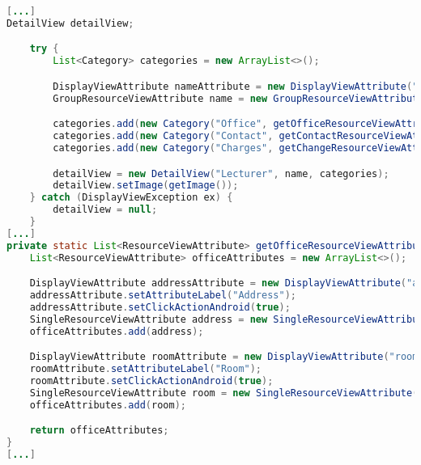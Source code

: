 \newpage

\begin{lstlisting}[label=lst:detailview_impl,
language=java,
firstnumber=1,
caption=Erstellung einer \textit{DetailView}.]				   
[...]
DetailView detailView;

	try {
		List<Category> categories = new ArrayList<>();

		DisplayViewAttribute nameAttribute = new DisplayViewAttribute("name", ViewAttribute.AttributeType.TEXT);
		GroupResourceViewAttribute name = new GroupResourceViewAttribute(nameAttribute, getViewTitleAttributes());

		categories.add(new Category("Office", getOfficeResourceViewAttributes()));
		categories.add(new Category("Contact", getContactResourceViewAttributes()));
		categories.add(new Category("Charges", getChangeResourceViewAttributes()));

		detailView = new DetailView("Lecturer", name, categories);
		detailView.setImage(getImage());
	} catch (DisplayViewException ex) {
		detailView = null;
	}
[...]
private static List<ResourceViewAttribute> getOfficeResourceViewAttributes() {
	List<ResourceViewAttribute> officeAttributes = new ArrayList<>();

	DisplayViewAttribute addressAttribute = new DisplayViewAttribute("address", ViewAttribute.AttributeType.LOCATION);
	addressAttribute.setAttributeLabel("Address");
	addressAttribute.setClickActionAndroid(true);
	SingleResourceViewAttribute address = new SingleResourceViewAttribute(addressAttribute);
	officeAttributes.add(address);

	DisplayViewAttribute roomAttribute = new DisplayViewAttribute("roomNumber", ViewAttribute.AttributeType.TEXT);
	roomAttribute.setAttributeLabel("Room");
	roomAttribute.setClickActionAndroid(true);
	SingleResourceViewAttribute room = new SingleResourceViewAttribute(roomAttribute);
	officeAttributes.add(room);

	return officeAttributes;
}
[...]
\end{lstlisting}

\newpage

